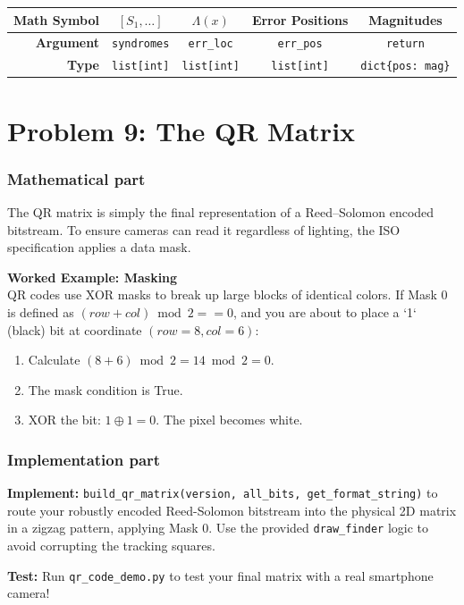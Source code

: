 \documentclass[11pt]{article}
\begin{document}
\vspace{0.5cm}

\begin{center}
\renewcommand{\arraystretch}{2.0}
\begin{tabular}{r | c | c | c | c}
\toprule
\textbf{Math Symbol} & $[S_1, \dots]$ & $\Lambda(x)$ & Error Positions & Magnitudes \\ \midrule
\textbf{Argument} & \lstinline|syndromes| & \lstinline|err_loc| & \lstinline|err_pos| & \lstinline|return| \\ \midrule
\textbf{Type} & \lstinline|list[int]| & \lstinline|list[int]| & \lstinline|list[int]| & \lstinline|dict{pos: mag}| \\
\bottomrule
\end{tabular}
\end{center}




\section*{Problem 9: The QR Matrix}

\subsubsection*{Mathematical part}
The QR matrix is simply the final representation of a Reed--Solomon encoded bitstream. To ensure cameras can read it regardless of lighting, the ISO specification applies a data mask.

\textbf{Worked Example: Masking} \\
QR codes use XOR masks to break up large blocks of identical colors. If Mask 0 is defined as $(row + col) \bmod 2 == 0$, and you are about to place a `1` (black) bit at coordinate $(row=8, col=6)$:
\begin{enumerate}
    \item Calculate $(8 + 6) \bmod 2 = 14 \bmod 2 = 0$.
    \item The mask condition is True.
    \item XOR the bit: $1 \oplus 1 = 0$. The pixel becomes white.
\end{enumerate}

\subsubsection*{Implementation part}
\textbf{Implement:} \lstinline|build_qr_matrix(version, all_bits, get_format_string)| to route your robustly encoded Reed-Solomon bitstream into the physical 2D matrix in a zigzag pattern, applying Mask 0. Use the provided \lstinline|draw_finder| logic to avoid corrupting the tracking squares.

\textbf{Test:} Run \lstinline|qr_code_demo.py| to test your final matrix with a real smartphone camera!
\end{document}
